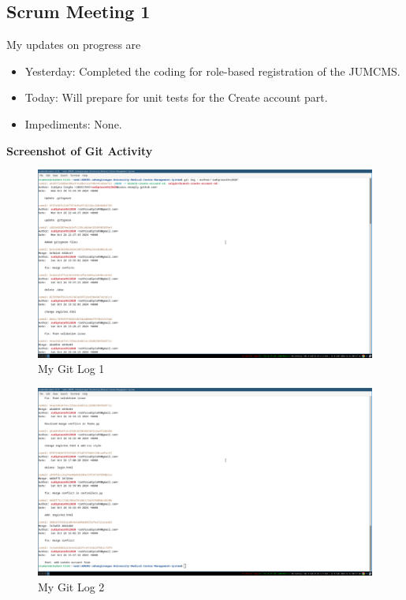 \documentclass[a4paper,12pt]{article}
\begin{document}
\subsection{Scrum Meeting 1}
My updates on progress are
\begin{itemize}
    \item Yesterday: Completed the coding for role-based registration of the JUMCMS.
    \item Today: Will prepare for unit tests for the Create account part.
    \item Impediments: None.
\end{itemize}
\textbf{\large{Screenshot of Git Activity}}
\begin{figure}[H]
    \centering
    \includegraphics[width=\textwidth]{spr1meet11.png}
    \caption{My Git Log 1}
\end{figure}
\begin{figure}[H]
    \centering
    \includegraphics[width=\textwidth]{spr1meet12.png}
    \caption{My Git Log 2}
\end{figure}
\newpage
\end{document}
